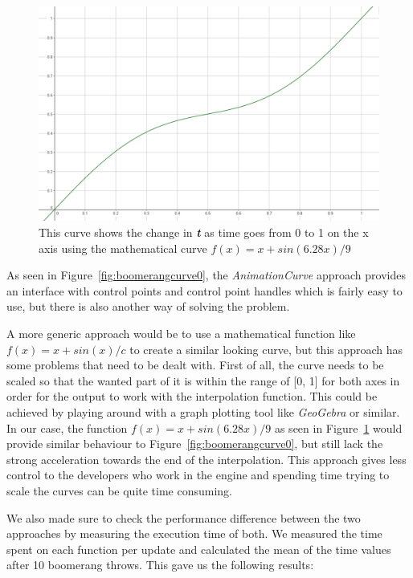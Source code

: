 \begin{figure}[tbph]
    \centering
    \includegraphics[width=.75\textwidth]{images/BoomerangMathematicalCurve}
    \caption[Boomerang curve using a mathematical formula]{This curve shows the change in \textbf{\textit{t}} as time goes from 0 to 1 on the x axis using the mathematical curve $f(x) = x + sin(6.28x) / 9$}
    \label{fig:boomerangcurve1}
\end{figure}
    
As seen in Figure~\ref{fig:boomerangcurve0}, the \emph{AnimationCurve} approach provides an interface with control points and control point handles which is fairly easy to use, but there is also another way of solving the problem. 

A more generic approach would be to use a mathematical function like $f(x) = x + sin(x) / c$ to create a similar looking curve, but this approach has some problems that need to be dealt with. First of all, the curve needs to be scaled so that the wanted part of it is within the range of [0, 1] for both axes in order for the output to work with the interpolation function. This could be achieved by playing around with a graph plotting tool like \emph{GeoGebra} or similar. In our case, the function $f(x) = x + sin(6.28x) / 9$ as seen in Figure~\ref{fig:boomerangcurve1} would provide similar behaviour to Figure~\ref{fig:boomerangcurve0}, but still lack the strong acceleration towards the end of the interpolation. This approach gives less control to the developers who work in the engine and spending time trying to scale the curves can be quite time consuming.

We also made sure to check the performance difference between the two approaches by measuring the execution time of both. We measured the time spent on each function per update and calculated the mean of the time values after 10 boomerang throws. This gave us the following results:

